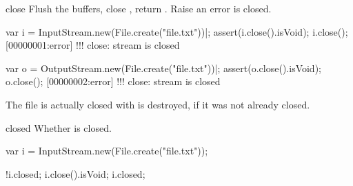 \begin{urbiscriptapi}
\item[close] Flush the buffers, close \this, return .  Raise
  an error \this is closed.
\begin{urbiscript}
var i = InputStream.new(File.create("file.txt"))|;
assert(i.close().isVoid);
i.close();
[00000001:error] !!! close: stream is closed

var o = OutputStream.new(File.create("file.txt"))|;
assert(o.close().isVoid);
o.close();
[00000002:error] !!! close: stream is closed
\end{urbiscript}

  The file is actually closed with \this is destroyed, if it was not already
  closed.


\item[closed] Whether \this is closed.
\begin{urbiassert}
var i = InputStream.new(File.create("file.txt"));

!i.closed;
i.close().isVoid;
i.closed;
\end{urbiassert}
\end{urbiscriptapi}

